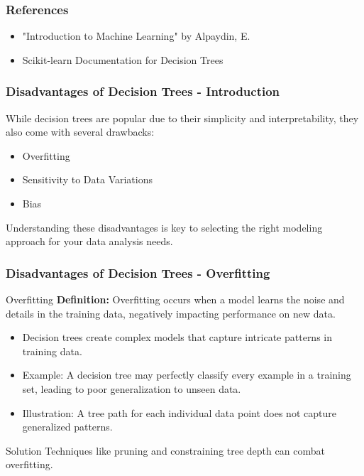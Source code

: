 \documentclass[aspectratio=169]{beamer}
\begin{document}
\begin{frame}[fragile]
    \frametitle{References}
    \begin{itemize}
        \item "Introduction to Machine Learning" by Alpaydin, E.
        \item Scikit-learn Documentation for Decision Trees
    \end{itemize}
\end{frame}

\begin{frame}[fragile]
    \frametitle{Disadvantages of Decision Trees - Introduction}
    While decision trees are popular due to their simplicity and interpretability, they also come with several drawbacks:
    \begin{itemize}
        \item Overfitting
        \item Sensitivity to Data Variations
        \item Bias
    \end{itemize}
    Understanding these disadvantages is key to selecting the right modeling approach for your data analysis needs.
\end{frame}

\begin{frame}[fragile]
    \frametitle{Disadvantages of Decision Trees - Overfitting}
    \begin{block}{Overfitting}
        \textbf{Definition:} Overfitting occurs when a model learns the noise and details in the training data, negatively impacting performance on new data.
    \end{block}
    \begin{itemize}
        \item Decision trees create complex models that capture intricate patterns in training data.
        \item Example: A decision tree may perfectly classify every example in a training set, leading to poor generalization to unseen data.
        \item Illustration: A tree path for each individual data point does not capture generalized patterns.
    \end{itemize}
    \begin{block}{Solution}
        Techniques like pruning and constraining tree depth can combat overfitting.
    \end{block}
\end{frame}
\end{document}

